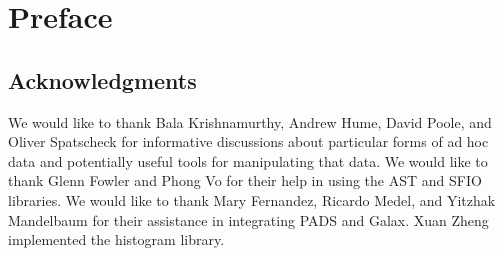 \chapter*{Preface}
\section*{Acknowledgments}
We would like to thank Bala Krishnamurthy, Andrew Hume, David Poole,
and Oliver Spatscheck
for informative discussions about particular forms of ad hoc data
and potentially useful tools for manipulating that data.  
We would like to thank Glenn Fowler and Phong Vo for their help in
using the AST and SFIO libraries.
We would like to thank Mary Fernandez, Ricardo Medel, and Yitzhak
Mandelbaum for their assistance in integrating PADS and Galax.
Xuan Zheng implemented the histogram library.


